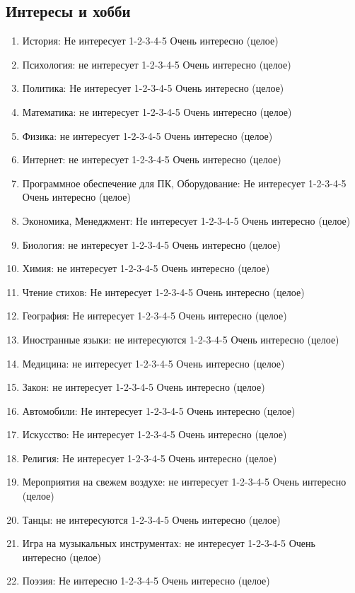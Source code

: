\documentclass[11pt]{article}
\begin{document}
\subsection{Интересы и хобби}
\begin{enumerate}
\item История: Не интересует 1-2-3-4-5 Очень интересно (целое)
\item Психология: не интересует 1-2-3-4-5 Очень интересно (целое)
\item Политика: Не интересует 1-2-3-4-5 Очень интересно (целое)
\item Математика: не интересует 1-2-3-4-5 Очень интересно (целое)
\item Физика: не интересует 1-2-3-4-5 Очень интересно (целое)
\item Интернет: не интересует 1-2-3-4-5 Очень интересно (целое)
\item Программное обеспечение для ПК, Оборудование: Не интересует 1-2-3-4-5 Очень интересно (целое)
\item Экономика, Менеджмент: Не интересует 1-2-3-4-5 Очень интересно (целое)
\item Биология: не интересует 1-2-3-4-5 Очень интересно (целое)
\item Химия: не интересует 1-2-3-4-5 Очень интересно (целое)
\item Чтение стихов: Не интересует 1-2-3-4-5 Очень интересно (целое)
\item География: Не интересует 1-2-3-4-5 Очень интересно (целое)
\item Иностранные языки: не интересуются 1-2-3-4-5 Очень интересно (целое)
\item Медицина: не интересует 1-2-3-4-5 Очень интересно (целое)
\item Закон: не интересует 1-2-3-4-5 Очень интересно (целое)
\item Автомобили: Не интересует 1-2-3-4-5 Очень интересно (целое)
\item Искусство: Не интересует 1-2-3-4-5 Очень интересно (целое)
\item Религия: Не интересует 1-2-3-4-5 Очень интересно (целое)
\item Мероприятия на свежем воздухе: не интересует 1-2-3-4-5 Очень интересно (целое)
\item Танцы: не интересуются 1-2-3-4-5 Очень интересно (целое)
\item Игра на музыкальных инструментах: не интересует 1-2-3-4-5 Очень интересно (целое)
\item Поэзия: Не интересно 1-2-3-4-5 Очень интересно (целое)

\end{enumerate}
\end{document}
